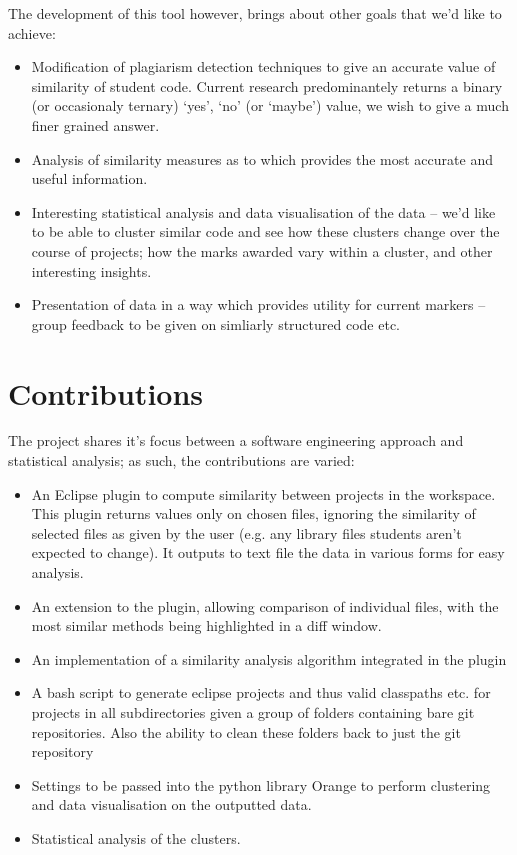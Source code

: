 The development of this tool however, brings about other goals that we'd like to
achieve:
\begin{itemize}

\item Modification of plagiarism detection techniques to give an accurate value
of similarity of student code. Current research predominantely returns a binary
(or occasionaly ternary) `yes', `no' (or `maybe') value, we wish to give a much
finer grained answer.

\item Analysis of similarity measures as to which provides the most accurate
and useful information.

\item Interesting statistical analysis and data visualisation of the data -- 
we'd like to be able to cluster similar code and see how these clusters change
over the course of projects; how the marks awarded vary within a cluster, and
other interesting insights. 

\item Presentation of data in a way which provides utility for current markers
-- group feedback to be given on simliarly structured code etc.

\end{itemize}

\section{Contributions}

The project shares it's focus between a software engineering approach and statistical
analysis; as such, the contributions are varied:

\begin{itemize}

\item An Eclipse plugin to compute similarity between projects in the workspace.
This plugin returns values only on chosen files, ignoring the
similarity of selected files as given by the user (e.g. any library files students
aren't expected to change). It outputs to text file the data in various forms
for easy analysis.

\item An extension to the plugin, allowing comparison of individual files,
with the most similar methods being highlighted in a diff window.

\item An implementation of a similarity analysis algorithm integrated in the
plugin

\item A bash script to generate eclipse projects and thus valid classpaths etc.
for projects in all subdirectories given a group of folders containing bare git
repositories. Also the ability to clean these folders back to just the git
repository

\item Settings to be passed into the python library Orange to perform clustering
and data visualisation on the outputted data.

\item Statistical analysis of the clusters.

\end{itemize}
